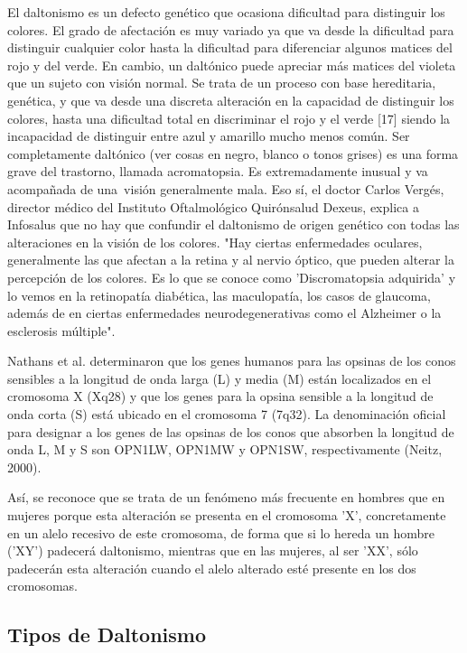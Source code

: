 \documentclass[10pt]{article}
\begin{document}
El daltonismo es un defecto genético que ocasiona dificultad para distinguir los colores. El grado de afectación es muy variado ya que va desde la dificultad para distinguir cualquier color hasta la dificultad para diferenciar algunos matices del rojo y del verde. En cambio, un daltónico puede apreciar más matices del violeta que un sujeto con visión normal\cite{IEEEreferencias:Ref28}.
Se trata de un proceso con base hereditaria, genética, y que va desde una discreta alteración en la capacidad de distinguir los colores, hasta una dificultad total en discriminar el rojo y el verde [17] siendo la incapacidad de distinguir entre azul y amarillo mucho menos común. Ser completamente daltónico (ver cosas en negro, blanco o tonos grises) es una forma grave del trastorno, llamada acromatopsia. Es extremadamente inusual y va acompañada de una visión generalmente mala\cite{IEEEreferencias:Ref29}.
Eso sí, el doctor Carlos Vergés, director médico del Instituto Oftalmológico Quirónsalud Dexeus, explica a Infosalus que no hay que confundir el daltonismo de origen genético con todas las alteraciones en la visión de los colores.    "Hay ciertas enfermedades oculares, generalmente las que afectan a la retina y al nervio óptico, que pueden alterar la percepción de los colores. Es lo que se conoce como 'Discromatopsia adquirida' y lo vemos en la retinopatía diabética, las maculopatía,  los casos de glaucoma, además de en ciertas enfermedades neurodegenerativas como el Alzheimer o la esclerosis múltiple"\cite{IEEEreferencias:Ref26}.

Nathans et al. determinaron que los genes humanos para las opsinas de los conos sensibles a la longitud de onda larga (L) y media (M) están localizados en el cromosoma X (Xq28) y que los genes para la opsina sensible a la longitud de onda corta (S) está ubicado en el cromosoma 7 (7q32). La denominación oficial para designar a los genes de las opsinas de los conos que absorben la longitud de onda L, M y S son OPN1LW, OPN1MW y OPN1SW, respectivamente (Neitz, 2000)\cite{IEEEreferencias:Ref30}.

Así, se reconoce que se trata de un fenómeno más frecuente en hombres que en mujeres porque esta alteración se presenta en el cromosoma 'X', concretamente en un alelo recesivo de este cromosoma, de forma que si lo hereda un hombre ('XY') padecerá daltonismo, mientras que en las mujeres, al ser 'XX', sólo padecerán esta alteración cuando el alelo alterado esté presente en los dos cromosomas\cite{IEEEreferencias:Ref26}.

\subsection{Tipos de Daltonismo}
\end{document}
